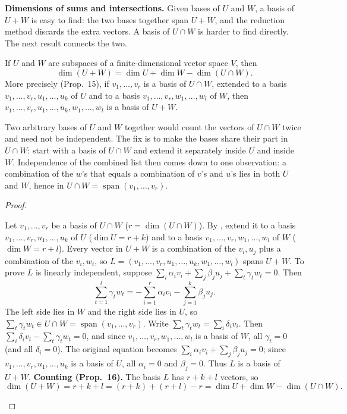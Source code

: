 \documentclass[10pt]{scrartcl}
\DeclareMathOperator{\spn}{span}
\begin{document}
\textbf{Dimensions of sums and intersections.} Given bases of $U$ and $W$, a basis of $U+W$ is easy to find: the two bases together span $U+W$, and the reduction method discards the extra vectors. A basis of $U\cap W$ is harder to find directly. The next result connects the two.

\begin{theorem*}
  If $U$ and $W$ are subspaces of a finite-dimensional vector space $V$, then
  \[
    \dim(U+W) = \dim U + \dim W - \dim(U\cap W).
  \]
  More precisely (Prop.~15), if $v_1,\dots,v_r$ is a basis of $U\cap W$, extended to a basis $v_1,\dots,v_r,u_1,\dots,u_k$ of $U$ and to a basis $v_1,\dots,v_r,w_1,\dots,w_l$ of $W$, then $v_1,\dots,v_r,u_1,\dots,u_k,w_1,\dots,w_l$ is a basis of $U+W$.
\end{theorem*}
\begin{ideabox}
  Two arbitrary bases of $U$ and $W$ together would count the vectors of $U\cap W$ twice and need not be independent. The fix is to make the bases share their part in $U\cap W$: start with a basis of $U\cap W$ and extend it separately inside $U$ and inside $W$. Independence of the combined list then comes down to one observation: a combination of the $w$'s that equals a combination of $v$'s and $u$'s lies in both $U$ and $W$, hence in $U\cap W=\spn(v_1,\dots,v_r)$.
\end{ideabox}
\begin{proof}
  \begin{steps}
    \ii Let $v_1,\dots,v_r$ be a basis of $U\cap W$ ($r=\dim(U\cap W)$). By , extend it to a basis $v_1,\dots,v_r,u_1,\dots,u_k$ of $U$ ($\dim U=r+k$) and to a basis $v_1,\dots,v_r,w_1,\dots,w_l$ of $W$ ($\dim W=r+l$).
    \ii Every vector in $U+W$ is a combination of the $v_i,u_j$ plus a combination of the $v_i,w_t$, so $L=(v_1,\dots,v_r,u_1,\dots,u_k,w_1,\dots,w_l)$ spans $U+W$.
    \ii To prove $L$ is linearly independent, suppose $\sum_{i}\alpha_iv_i+\sum_{j}\beta_ju_j+\sum_{t}\gamma_tw_t=0$. Then
    \[
      \sum_{t=1}^l \gamma_tw_t = -\sum_{i=1}^r\alpha_iv_i - \sum_{j=1}^k\beta_ju_j.
    \]
    The left side lies in $W$ and the right side lies in $U$, so $\sum_{t}\gamma_tw_t\in U\cap W=\spn(v_1,\dots,v_r)$.
    \ii Write $\sum_{t}\gamma_tw_t=\sum_{i}\delta_iv_i$. Then $\sum_{i}\delta_iv_i-\sum_{t}\gamma_tw_t=0$, and since $v_1,\dots,v_r,w_1,\dots,w_l$ is a basis of $W$, all $\gamma_t=0$ (and all $\delta_i=0$).
    \ii The original equation becomes $\sum_{i}\alpha_iv_i+\sum_{j}\beta_ju_j=0$; since $v_1,\dots,v_r,u_1,\dots,u_k$ is a basis of $U$, all $\alpha_i=0$ and $\beta_j=0$. Thus $L$ is a basis of $U+W$.
    \ii \textbf{Counting (Prop.~16).} The basis $L$ has $r+k+l$ vectors, so
    \[
      \dim(U+W)=r+k+l=(r+k)+(r+l)-r=\dim U+\dim W-\dim(U\cap W).
    \]
  \end{steps}
\end{proof}
\end{document}

